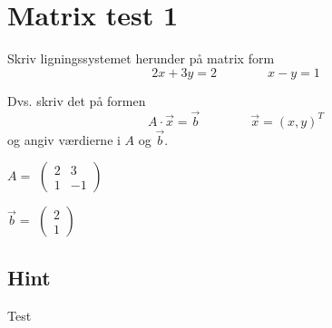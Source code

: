 \documentclass{article}
\newenvironment{exercise}[1]{\newpage\section{#1}}{}
\newenvironment{answermatrix}{\(\begin{pmatrix}}{\end{pmatrix}\)}
\newcommand{\hint}{\subsection*{Hint}}
\begin{document}
\begin{exercise}{Matrix test 1}

Skriv ligningssystemet herunder på matrix form
\[
2x + 3y = 2 \qquad \qquad
x - y = 1
\]

Dvs. skriv det på formen
\[
A \cdot \vec{x} = \vec{b} \qquad \qquad \vec{x} = (x, y)^T
\]
og angiv værdierne i \(A\) og \(\vec{b}\).

\( A = \)
\begin{answermatrix}
2 & 3 \\
1 & -1
\end{answermatrix}


\( \vec{b} = \)
\begin{answermatrix}
2 \\
1
\end{answermatrix}

\hint
Test
\end{exercise}
\end{document}
